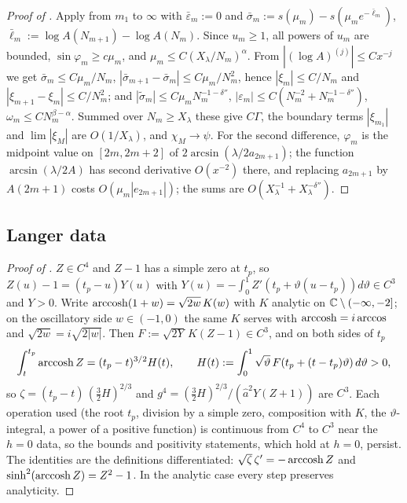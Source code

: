 \begin{proof}[Proof of ]
Apply  from $m_1$ to $\infty$ with $\bar\varepsilon_m:=0$ and
$\bar\sigma_m:=s(\mu_m)-s(\mu_me^{-\bar\ell_m})$, $\bar\ell_m:=\log A(N_{m+1})-\log A(N_m)$. Since
$u_m\ge1$, all powers of $u_m$ are bounded, $\sin\varphi_m\ge c\mu_m$, and
$\mu_m\le C(X_\lambda/N_m)^\alpha$. From $|(\log A)^{(j)}|\le Cx^{-j}$ we get $\bar\sigma_m\le C\mu_m/N_m$,
$|\bar\sigma_{m+1}-\bar\sigma_m|\le C\mu_m/N_m^2$, hence $|\xi_m|\le C/N_m$ and
$|\xi_{m+1}-\xi_m|\le C/N_m^2$; and $|\tilde\sigma_m|\le C\mu_mN_m^{-1-\delta''}$,
$|\varepsilon_m|\le C(N_m^{-2}+N_m^{-1-\delta''})$, $\omega_m\le CN_m^{\beta-\alpha}$. Summed over
$N_m\ge X_\lambda$ these give $C\Gamma$, the boundary terms $|\xi_{m_1}|$ and $\lim|\xi_M|$ are
$O(1/X_\lambda)$, and $\chi_M\to\psi$. For the second difference, $\varphi_m$ is the midpoint value
on $[2m,2m+2]$ of $2\arcsin(\lambda/2a_{2m+1})$; the function $\arcsin(\lambda/2A)$ has second
derivative $O(x^{-2})$ there, and replacing $a_{2m+1}$ by $A(2m+1)$ costs $O(\mu_m|e_{2m+1}|)$;
the sums are $O(X_\lambda^{-1}+X_\lambda^{-\delta''})$.
\end{proof}

\subsection{Langer data}

\begin{proof}[Proof of ]
$Z\in C^4$ and $Z-1$ has a simple zero at $t_p$, so $Z(u)-1=(t_p-u)Y(u)$ with
$Y(u)=-\int_0^1Z'(t_p+\vartheta(u-t_p))d\vartheta\in C^3$ and $Y>0$. Write
$\operatorname{arccosh}(1+w)=\sqrt{2w}\,K(w)$ with $K$ analytic on $\mathbb{C}\setminus(-\infty,-2]$; on the
oscillatory side $w\in(-1,0)$ the same $K$ serves with $\operatorname{arccosh}=i\arccos$ and
$\sqrt{2w}=i\sqrt{2|w|}$. Then $F:=\sqrt{2Y}\,K(Z-1)\in C^3$, and on both sides of $t_p$
\[
  \int_t^{t_p}\operatorname{arccosh} Z=(t_p-t)^{3/2}H(t),\qquad H(t):=\int_0^1\sqrt\vartheta\,F(t_p+(t-t_p)\vartheta)\,d\vartheta>0,
\]
so $\zeta=(t_p-t)\,(\tfrac32H)^{2/3}$ and $g^4=(\tfrac32H)^{2/3}/(\hat a^2Y(Z+1))$ are $C^3$. Each
operation used (the root $t_p$, division by a simple zero, composition with $K$, the
$\vartheta$-integral, a power of a positive function) is continuous from $C^4$ to $C^3$ near
the $h=0$ data, so the bounds and positivity statements, which hold at $h=0$, persist.
The identities are the definitions differentiated: $\sqrt\zeta\,\zeta'=-\operatorname{arccosh} Z$ and
$\sinh^2(\operatorname{arccosh} Z)=Z^2-1$. In the analytic case every step preserves analyticity.
\end{proof}


